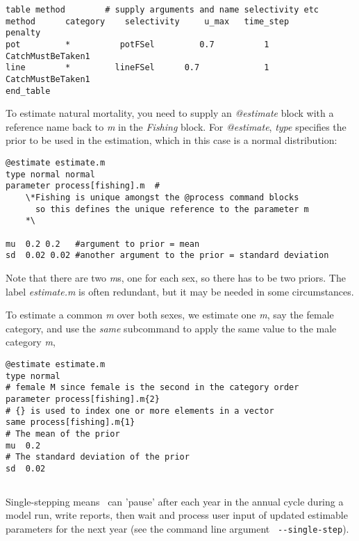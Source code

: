 {\small{\begin{verbatim}
table method        # supply arguments and name selectivity etc
method  	category 	selectivity 	u_max 	time_step 		penalty
pot        	*  	       potFSel		   0.7 			1 	CatchMustBeTaken1
line     	*  	      lineFSel 	    0.7 			1 	CatchMustBeTaken1
end_table
\end{verbatim}}}

To estimate natural mortality, you need to supply an \textit{@estimate} block with a reference name back to \textit{m} in the \textit{Fishing} block. For \textit{@estimate}, \textit{type} specifies the prior to be used in the estimation, which in this case is a normal distribution:

{\small{\begin{verbatim}
@estimate estimate.m
type normal normal
parameter process[fishing].m  #
    \*Fishing is unique amongst the @process command blocks
      so this defines the unique reference to the parameter m
    *\

mu  0.2 0.2   #argument to prior = mean
sd  0.02 0.02 #another argument to the prior = standard deviation
\end{verbatim}}}

Note that there are two \textit{m}s, one for each sex, so there has to be two priors. The \textit{\@estiamte} label \textit{estimate.m} is often redundant, but it may be needed in some circumstances.

To estimate a common \textit{m} over both sexes, we estimate one \textit{m}, say the female category, and use the \textit{same} subcommand to apply the same value to the male category \textit{m},

{\small{\begin{verbatim}
@estimate estimate.m
type normal
# female M since female is the second in the category order
parameter process[fishing].m{2}
# {} is used to index one or more elements in a vector
same process[fishing].m{1}
# The mean of the prior
mu  0.2
# The standard deviation of the prior
sd  0.02
\end{verbatim}}}

\subsection{\label{sec:SingleStepping}}


Single-stepping means \CNAME\ can 'pause' after each year in the annual cycle during a model run, write reports, then wait and process user input of updated estimable parameters for the next year (see the command line argument \texttt{ -{}-single-step}).

